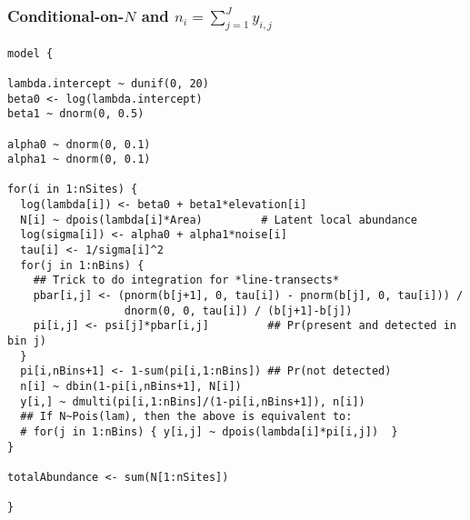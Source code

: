 \documentclass[color=usenames,dvipsnames]{beamer}\usepackage[]{graphicx}\usepackage[]{xcolor}
\makeatletter
\newenvironment{kframe}{%
 \def\at@end@of@kframe{}%
 \ifinner\ifhmode%
  \def\at@end@of@kframe{\end{minipage}}%
  \begin{minipage}{\columnwidth}%
 \fi\fi%
 \def\FrameCommand##1{\hskip\@totalleftmargin \hskip-\fboxsep
 \colorbox{shadecolor}{##1}\hskip-\fboxsep
     \hskip-\linewidth \hskip-\@totalleftmargin \hskip\columnwidth}%
 \MakeFramed {\advance\hsize-\width
   \@totalleftmargin\z@ \linewidth\hsize
   \@setminipage}}%
 {\par\unskip\endMakeFramed%
 \at@end@of@kframe}
\newenvironment{knitrout}{}{} %
\makeatother
\begin{document}
\begin{frame}[fragile]
  \frametitle{\normalsize Conditional-on-$N$ and $n_i=\sum_{j=1}^{J} y_{i,j}$}
\vspace{-3pt}
\begin{knitrout}\tiny
{}\color{fgcolor}\begin{kframe}
\begin{verbatim}
model {

lambda.intercept ~ dunif(0, 20)
beta0 <- log(lambda.intercept)
beta1 ~ dnorm(0, 0.5)

alpha0 ~ dnorm(0, 0.1)
alpha1 ~ dnorm(0, 0.1)

for(i in 1:nSites) {
  log(lambda[i]) <- beta0 + beta1*elevation[i]
  N[i] ~ dpois(lambda[i]*Area)         # Latent local abundance
  log(sigma[i]) <- alpha0 + alpha1*noise[i]
  tau[i] <- 1/sigma[i]^2
  for(j in 1:nBins) {
    ## Trick to do integration for *line-transects*
    pbar[i,j] <- (pnorm(b[j+1], 0, tau[i]) - pnorm(b[j], 0, tau[i])) /
                  dnorm(0, 0, tau[i]) / (b[j+1]-b[j])
    pi[i,j] <- psi[j]*pbar[i,j]         ## Pr(present and detected in bin j)
  }
  pi[i,nBins+1] <- 1-sum(pi[i,1:nBins]) ## Pr(not detected)
  n[i] ~ dbin(1-pi[i,nBins+1], N[i])
  y[i,] ~ dmulti(pi[i,1:nBins]/(1-pi[i,nBins+1]), n[i])
  ## If N~Pois(lam), then the above is equivalent to:
  # for(j in 1:nBins) { y[i,j] ~ dpois(lambda[i]*pi[i,j])  }
}

totalAbundance <- sum(N[1:nSites])

}
\end{verbatim}
\end{kframe}
\end{knitrout}
\end{frame}
\end{document}
